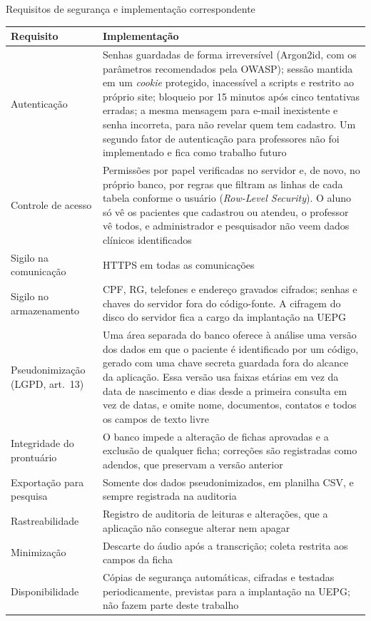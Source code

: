 \begin{quadro}[htbp]
	\caption{Requisitos de segurança e implementação correspondente}
	\label{qua:seguranca}
	\footnotesize
	\begin{tabularx}{\textwidth}{|L{3.2cm}|Y|}
		\hline
		\textbf{Requisito} & \textbf{Implementação} \\ \hline
		Autenticação & Senhas guardadas de forma irreversível (Argon2id, com os parâmetros recomendados pela OWASP); sessão mantida em um \textit{cookie} protegido, inacessível a scripts e restrito ao próprio site; bloqueio por 15 minutos após cinco tentativas erradas; a mesma mensagem para e-mail inexistente e senha incorreta, para não revelar quem tem cadastro. Um segundo fator de autenticação para professores não foi implementado e fica como trabalho futuro \\ \hline
		Controle de acesso & Permissões por papel verificadas no servidor e, de novo, no próprio banco, por regras que filtram as linhas de cada tabela conforme o usuário (\textit{Row-Level Security}). O aluno só vê os pacientes que cadastrou ou atendeu, o professor vê todos, e administrador e pesquisador não veem dados clínicos identificados \\ \hline
		Sigilo na comunicação & HTTPS em todas as comunicações \\ \hline
		Sigilo no armazenamento & CPF, RG, telefones e endereço gravados cifrados; senhas e chaves do servidor fora do código-fonte. A cifragem do disco do servidor fica a cargo da implantação na UEPG \\ \hline
		Pseudonimização (LGPD, art.~13) & Uma área separada do banco oferece à análise uma versão dos dados em que o paciente é identificado por um código, gerado com uma chave secreta guardada fora do alcance da aplicação. Essa versão usa faixas etárias em vez da data de nascimento e dias desde a primeira consulta em vez de datas, e omite nome, documentos, contatos e todos os campos de texto livre \\ \hline
		Integridade do prontuário & O banco impede a alteração de fichas aprovadas e a exclusão de qualquer ficha; correções são registradas como adendos, que preservam a versão anterior \\ \hline
		Exportação para pesquisa & Somente dos dados pseudonimizados, em planilha CSV, e sempre registrada na auditoria \\ \hline
		Rastreabilidade & Registro de auditoria de leituras e alterações, que a aplicação não consegue alterar nem apagar \\ \hline
		Minimização & Descarte do áudio após a transcrição; coleta restrita aos campos da ficha \\ \hline
		Disponibilidade & Cópias de segurança automáticas, cifradas e testadas periodicamente, previstas para a implantação na UEPG; não fazem parte deste trabalho \\ \hline
	\end{tabularx}
\end{quadro}


